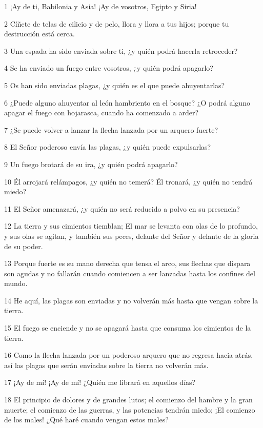 \par 1 ¡Ay de ti, Babilonia y Asia! ¡Ay de vosotros, Egipto y Siria!
\par 2 Cíñete de telas de cilicio y de pelo, llora y llora a tus hijos; porque tu destrucción está cerca.
\par 3 Una espada ha sido enviada sobre ti, ¿y quién podrá hacerla retroceder?
\par 4 Se ha enviado un fuego entre vosotros, ¿y quién podrá apagarlo?
\par 5 Os han sido enviadas plagas, ¿y quién es el que puede ahuyentarlas?
\par 6 ¿Puede alguno ahuyentar al león hambriento en el bosque? ¿O podrá alguno apagar el fuego con hojarasca, cuando ha comenzado a arder?
\par 7 ¿Se puede volver a lanzar la flecha lanzada por un arquero fuerte?
\par 8 El Señor poderoso envía las plagas, ¿y quién puede expulsarlas?
\par 9 Un fuego brotará de su ira, ¿y quién podrá apagarlo?
\par 10 Él arrojará relámpagos, ¿y quién no temerá? Él tronará, ¿y quién no tendrá miedo?
\par 11 El Señor amenazará, ¿y quién no será reducido a polvo en su presencia?
\par 12 La tierra y sus cimientos tiemblan; El mar se levanta con olas de lo profundo, y sus olas se agitan, y también sus peces, delante del Señor y delante de la gloria de su poder.
\par 13 Porque fuerte es su mano derecha que tensa el arco, sus flechas que dispara son agudas y no fallarán cuando comiencen a ser lanzadas hasta los confines del mundo.
\par 14 He aquí, las plagas son enviadas y no volverán más hasta que vengan sobre la tierra.
\par 15 El fuego se enciende y no se apagará hasta que consuma los cimientos de la tierra.
\par 16 Como la flecha lanzada por un poderoso arquero que no regresa hacia atrás, así las plagas que serán enviadas sobre la tierra no volverán más.
\par 17 ¡Ay de mí! ¡Ay de mí! ¿Quién me librará en aquellos días?
\par 18 El principio de dolores y de grandes lutos; el comienzo del hambre y la gran muerte; el comienzo de las guerras, y las potencias tendrán miedo; ¡El comienzo de los males! ¿Qué haré cuando vengan estos males?
